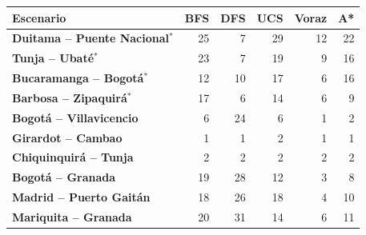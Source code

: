 \renewcommand{\arraystretch}{1.2}
\begin{tabular}{|l|r|r|r|r|r|}
\hline
\rowcolor{gray!20} \textbf{Escenario} & \textbf{BFS} & \textbf{DFS} & \textbf{UCS} & \textbf{Voraz} & \textbf{A*} \\
\hline
\textbf{Duitama -- Puente Nacional$^{*}$} & 25 & 7 & 29 & 12 & 22 \\
\hline
\textbf{Tunja -- Ubaté$^{*}$} & 23 & 7 & 19 & 9 & 16 \\
\hline
\textbf{Bucaramanga -- Bogotá$^{*}$} & 12 & 10 & 17 & 6 & 16 \\
\hline
\textbf{Barbosa -- Zipaquirá$^{*}$} & 17 & 6 & 14 & 6 & 9 \\
\hline
\textbf{Bogotá -- Villavicencio} & 6 & 24 & 6 & 1 & 2 \\
\hline
\textbf{Girardot -- Cambao} & 1 & 1 & 2 & 1 & 1 \\
\hline
\textbf{Chiquinquirá -- Tunja} & 2 & 2 & 2 & 2 & 2 \\
\hline
\textbf{Bogotá -- Granada} & 19 & 28 & 12 & 3 & 8 \\
\hline
\textbf{Madrid -- Puerto Gaitán} & 18 & 26 & 18 & 4 & 10 \\
\hline
\textbf{Mariquita -- Granada} & 20 & 31 & 14 & 6 & 11 \\
\hline
\end{tabular}
